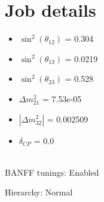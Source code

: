 \documentclass[10pt,a4paper]{article}
\begin{document}
\section*{Job details}


\begin{minipage}[t]{0.5\textwidth}
\begin{itemize}
\item[] $\sin^2(\theta_{12})$ = 0.304
\item[] $\sin^2(\theta_{13})$ = 0.0219
\item[] $\sin^2(\theta_{23})$ = 0.528
\item[] $\Delta m^2_{21}$ = 7.53e-05
\item[] $|\Delta m^2_{32}|$ = 0.002509
\item[] $\delta_{CP}$ = 0.0
\end{itemize}
\end{minipage}
\\



BANFF tunings: Enabled

Hierarchy: Normal
\end{document}
